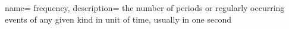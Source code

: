  {
    name= frequency,
    description= {the number of periods or regularly occurring events of any given kind in unit of time, usually in one second}
}
